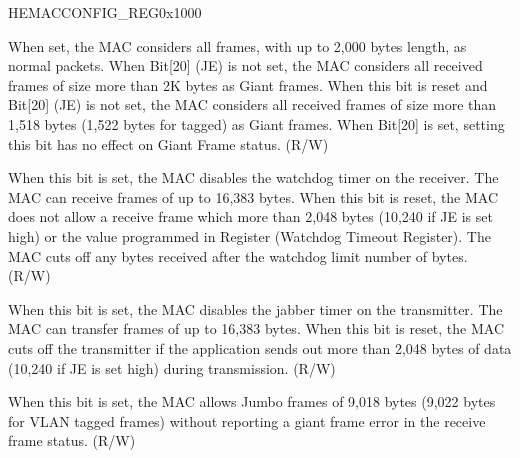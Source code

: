 \begin{register}{H}{EMACCONFIG\_REG}{0x1000}
\begin{regdesc}
\begin{reglist}
\item [ASS2KP]When set, the MAC considers all frames, with up to 2,000 bytes length, as normal packets. When Bit[20] (JE) is not set, the MAC considers all received frames of size more than 2K bytes as Giant frames. When this bit is reset and Bit[20] (JE) is not set, the MAC considers all received frames of size more than 1,518 bytes (1,522 bytes for tagged) as Giant frames. When Bit[20] is set, setting this bit has no effect on Giant Frame status. (R/W)
\item [EMACWATCHDOG]When this bit is set, the MAC disables the watchdog timer on the receiver. The MAC can receive frames of up to 16,383 bytes. When this bit is reset, the MAC does not allow a receive frame which more than 2,048 bytes (10,240 if JE is set high) or the value programmed in Register (Watchdog Timeout Register). The MAC cuts off any bytes received after the watchdog limit number of bytes. (R/W)
\item [EMACJABBER]When this bit is set, the MAC disables the jabber timer on the transmitter. The MAC can transfer frames of up to 16,383 bytes. When this bit is reset, the MAC cuts off the transmitter if the application sends out more than 2,048 bytes of data (10,240 if JE is set high) during transmission. (R/W)
\item [EMACJUMBOFRAME]When this bit is set, the MAC allows Jumbo frames of 9,018 bytes (9,022 bytes for VLAN tagged frames) without reporting a giant frame error in the receive frame status. (R/W)
\item [Continued on the next page...]
\end{reglist}\end{regdesc}
\end{register}

